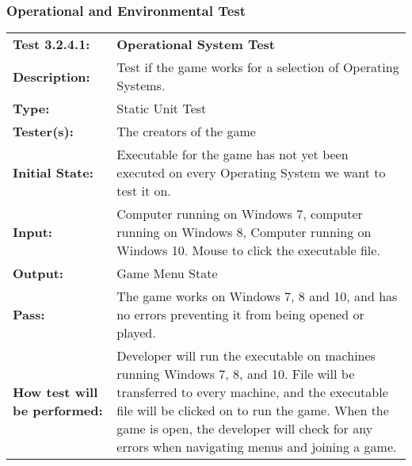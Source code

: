 \documentclass[12pt, titlepage]{article}
\begin{document}
\subsubsection{Operational and Environmental Test}
\begin{mdframed}[linewidth=1pt]
\begin{tabularx}{\textwidth}{@{}p{3cm}X@{}}
{\bf Test 3.2.4.1:} & {\bf Operational System Test}\\[\baselineskip]
{\bf Description:} & Test if the game works for a selection of Operating Systems.\\[0.5\baselineskip]
{\bf Type:} & Static Unit Test\\[0.5\baselineskip]
{\bf Tester(s):} & The creators of the game\\[0.5\baselineskip]
{\bf Initial State:} & Executable for the game has not yet been executed on every Operating System we want to test it on.\\[0.5\baselineskip]
{\bf Input:} & Computer running on Windows 7, computer running on Windows 8, Computer running on Windows 10. Mouse to click the executable file.\\[0.5\baselineskip]
{\bf Output:} & Game Menu State\\[0.5\baselineskip]
{\bf Pass:} & The game works on Windows 7, 8 and 10, and has no errors preventing it from being opened or played.\\[0.5\baselineskip]
{\bf How test will be performed:} & Developer will run the executable on machines running Windows 7, 8, and 10. File will be transferred to every machine, and the executable file will be clicked on to run the game. When the game is open, the developer will check for any errors when navigating menus and joining a game. 
\end{tabularx}
\end{mdframed}
\end{document}
